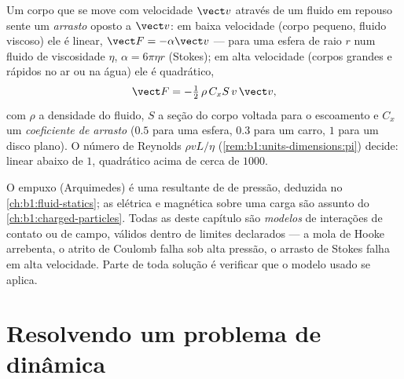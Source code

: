 \begin{proposition}\label{prop:b1:newton-dynamics:drag}
Um corpo que se move com velocidade $\vect v$ através de um fluido em repouso sente um
\emph{arrasto} oposto a $\vect v$: em baixa velocidade (corpo pequeno, fluido
viscoso) ele é linear, $\vect F = -\alpha\vect v$ --- para uma esfera de
raio $r$ num fluido de viscosidade $\eta$, $\alpha = 6\pi\eta r$
(Stokes); em alta velocidade (corpos grandes e rápidos no ar ou na água) ele é
quadrático,
\[
\vect F = -\tfrac12\,\rho\,C_xS\,v\,\vect v ,
\]
com $\rho$ a densidade do fluido, $S$ a seção do corpo voltada para
o escoamento e $C_x$ um \emph{coeficiente de arrasto}  ($0.5$ para uma
esfera, $0.3$ para um carro, $1$ para um disco plano). O número de Reynolds
$\rho vL/\eta$ (\cref{rem:b1:units-dimensions:pi}) decide: linear
abaixo de $1$, quadrático acima de cerca de $1000$.
\end{proposition}
\admitted

\begin{remark}\label{rem:b1:newton-dynamics:others}
O empuxo (Arquimedes) é uma resultante de  de pressão, deduzida no
\cref{ch:b1:fluid-statics}; as  elétrica e magnética sobre uma
carga são assunto do \cref{ch:b1:charged-particles}. Todas as
 deste capítulo são \emph{modelos} de interações de contato ou de
campo, válidos dentro de limites declarados --- a mola de Hooke arrebenta,
o atrito de Coulomb falha sob alta pressão, o arrasto de Stokes falha em alta
velocidade. Parte de toda solução é verificar que o modelo usado se aplica.
\end{remark}

\section{Resolvendo um problema de dinâmica}

